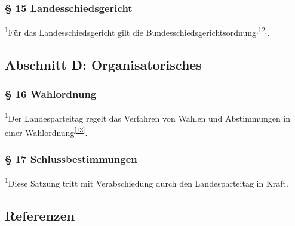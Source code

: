 \subsubsection{§ 15 Landesschiedsgericht}

\textsuperscript{1}Für das Landesschiedsgericht gilt die
Bundesschiedsgerichtsordnung\textsuperscript{\href{\#cite\_note-11}{{[}12{]}}}.

\subsection{Abschnitt D: Organisatorisches}

\subsubsection{§ 16 Wahlordnung}

\textsuperscript{1}Der Landesparteitag regelt das Verfahren von Wahlen
und Abstimmungen in einer
Wahlordnung\textsuperscript{\href{\#cite\_note-12}{{[}13{]}}}.

\subsubsection{§ 17 Schlussbestimmungen}

\textsuperscript{1}Diese Satzung tritt mit Verabschiedung durch den
Landesparteitag in Kraft.

\subsection{Referenzen}

